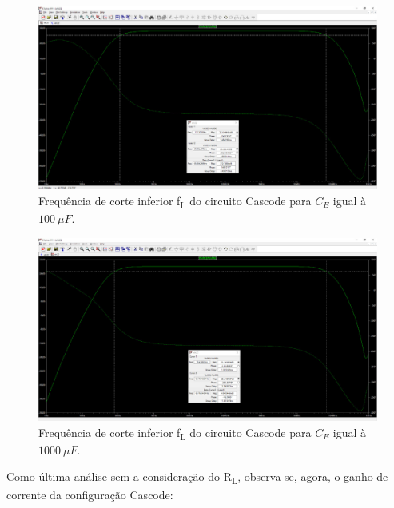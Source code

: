 \documentclass[journal, a4paper]{IEEEtran}
\newcommand\tab[1][1cm]{\hspace*{#1}}
\begin{document}
            \begin{figure}[H]
        		\begin{center}
        		\includegraphics[width=\columnwidth]{100.jpeg}
        		\caption{Frequência de corte inferior f\textsubscript{L} do circuito Cascode para $C_E$ igual à $100 \: \mu F$.}
        		\label{fl ce1}
        		\end{center}
    	    \end{figure}
    	    
    	    \begin{figure}[H]
        		\begin{center}
        		\includegraphics[width=\columnwidth]{1000.jpeg}
        		\caption{Frequência de corte inferior f\textsubscript{L} do circuito Cascode para $C_E$ igual à $1000 \: \mu F$.}
        		\label{fl ce2}
        		\end{center}
    	    \end{figure}
        \tab Como última análise sem a consideração do R\textsubscript{L}, observa-se, agora, o ganho de corrente da configuração Cascode:
        
\end{document}
